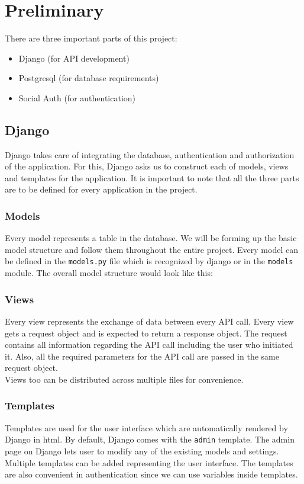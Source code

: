 \chapter{Preliminary}
There are three important parts of this project:
\begin{itemize}
    \item Django (for API development)
    \item Postgresql (for database requirements)
    \item Social Auth (for authentication)
\end{itemize}

\section{Django}
Django takes care of integrating the database, authentication and authorization
of the application. For this, Django asks us to construct each of models, views
and templates for the application. It is important to note that all the three
parts are to be defined for every application in the project.

\subsection{Models}
Every model represents a table in the database. We will be forming up the
basic model structure and follow them throughout the entire project.
Every model can be defined in the \texttt{models.py} file which is recognized
by django or in the \texttt{models} module. The overall model structure would
look like this:


\subsection{Views}
Every view represents the exchange of data between every API call. Every view
gets a request object and is expected to return a response object. The request
contains all information regarding the API call including the user who
initiated it. Also, all the required parameters for the API call are passed
in the same request object.\\
Views too can be distributed across multiple files for convenience.

\subsection{Templates}
Templates are used for the user interface which are automatically rendered by
Django in html. By default, Django comes with the \texttt{admin} template.
The admin page on Django lets user to modify any of the existing models and
settings. Multiple templates can be added representing the user interface.
The templates are also convenient in authentication since we can use variables
inside templates.

